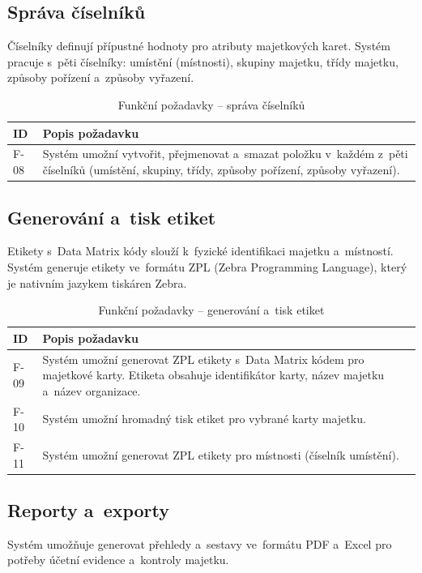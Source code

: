 \subsection{Správa číselníků}

Číselníky definují přípustné hodnoty pro atributy majetkových karet. Systém pracuje s~pěti číselníky: umístění (místnosti), skupiny majetku, třídy majetku, způsoby pořízení a~způsoby vyřazení.

\begin{table}[H]\centering
\renewcommand{\arraystretch}{1.4}
\caption{Funkční požadavky -- správa číselníků}\label{tab:freq-dictionaries}
\begin{tabular}{l|p{10cm}}
	\textbf{ID} & \textbf{Popis požadavku} \tabularnewline \hline
	F-08 & Systém umožní vytvořit, přejmenovat a~smazat položku v~každém z~pěti číselníků (umístění, skupiny, třídy, způsoby pořízení, způsoby vyřazení). \tabularnewline
\end{tabular}
\end{table}

\subsection{Generování a~tisk etiket}

Etikety s~Data Matrix kódy slouží k~fyzické identifikaci majetku a~místností. Systém generuje etikety ve~formátu ZPL (Zebra Programming Language), který je nativním jazykem tiskáren Zebra.

\begin{table}[H]\centering
\renewcommand{\arraystretch}{1.4}
\caption{Funkční požadavky -- generování a~tisk etiket}\label{tab:freq-labels}
\begin{tabular}{l|p{10cm}}
	\textbf{ID} & \textbf{Popis požadavku} \tabularnewline \hline
	F-09 & Systém umožní generovat ZPL etikety s~Data Matrix kódem pro majetkové karty. Etiketa obsahuje identifikátor karty, název majetku a~název organizace. \tabularnewline
	F-10 & Systém umožní hromadný tisk etiket pro vybrané karty majetku. \tabularnewline
	F-11 & Systém umožní generovat ZPL etikety pro místnosti (číselník umístění). \tabularnewline
\end{tabular}
\end{table}

\subsection{Reporty a~exporty}

Systém umožňuje generovat přehledy a~sestavy ve~formátu PDF a~Excel pro potřeby účetní evidence a~kontroly majetku.

